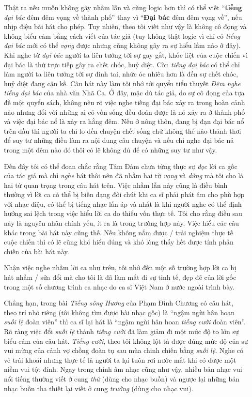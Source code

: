 \documentclass[../main.tex]{subfiles}
\begin{document}
\begin{multicols}{2}
Thật ra nếu muốn không gây nhầm lẫn và cũng logic hơn thì có thể viết “\textbf{tiếng }\textit{đại bác} đêm đêm vọng về thành phố” thay vì “\textbf{Đại bác} đêm đêm vọng về”, nếu nhịp điệu bài hát cho phép. Tuy nhiên, theo tôi viết như vậy là không cô đọng và không biểu cảm bằng cách viết của tác giả (tuy không thật logic vì chỉ có \textit{tiếng đại bác} mới có thể \textit{vọng }được nhưng cũng không gây ra sự hiểu lầm nào ở đây). Khi nghe từ \textit{đại bác} người ta liên tưởng tới sự gay gắt, khốc liệt của cuộc chiến vì đại bác là thứ trực tiếp gây ra chết chóc, huỷ diệt. Còn \textit{tiếng đại bác} có thể chỉ làm người ta liên tưởng tới sự đinh tai, nhức óc nhiêu hơn là đến sự chết chóc, huỷ diệt đang cận kề. Câu hát này làm tôi nhớ tới quyển tiểu thuyết \textit{Đêm nghe tiếng đại bác} của nhà văn Nhã Ca. Ở đây, mặc dù tác giả, do sự cô đọng của tựa đề một quyển sách, không nêu rõ việc nghe tiếng đại bác xảy ra trong hoàn cảnh nào nhưng đối với những ai có vốn sống đều đoán được là nó xảy ra ở thành phố và việc đại bác nổ là xảy ra hằng đêm. Nếu ở nông thôn, đang bị đạn đại bác nổ trên đầu thì người ta chỉ lo đến chuyện chết sống chứ không thể nào thảnh thơi để suy tư những điều làm ra nội dung câu chuyện và nếu chỉ nghe đại bác nả trong một đêm nào đó thôi có lẽ không đủ để có những suy tư như vậy. 
 
Đến đây tôi có thể đoan chắc rằng Tâm Đàm chưa từng thực sự \textit{đọc} lời ca gốc của tác giả mà chỉ \textit{nghe} hát thôi nên đã nhầm hai từ \textit{vọng} và \textit{dừng} mà tôi cho là hai từ quan trọng trong câu hát trên. Việc nhầm lẫn này cũng là điều bình thường vì lời ca có thể bị biến dạng đôi chút khi ca sĩ phải phát âm cho phù hợp với nhạc điệu, có thể bị tiếng nhạc lấn áp và nhất là khi người nghe có thể định hướng sai lệch trong việc hiểu lời ca do thiếu vốn thực tế. Tôi cho rằng điều sau này là nguyên nhân chính yếu, ít ra là trong trường hợp này. Việc hiểu các câu khác trong bài hát này cũng thế. Nếu không nắm được / trải nghiệm thực tế cuộc chiến thì có lẽ cũng khó hiểu đúng và khó lòng thấy hết được tính phản chiến của bài hát này. 
  
Nhận việc nghe nhầm lời ca như trên, tôi nhớ đến một số trường hợp lời ca bị hát nhầm / sửa đổi mà cho tôi là đã làm mất đi sự tinh tế, đẹp đẽ của lời gốc trong một số chương trình ca nhạc do ca sĩ Việt Nam ở nước ngoài trình bày. 
 
Chẳng hạn, trong bài \textit{Tiếng sông Hương} của Phạm Đình Chương có câu hát, theo trí nhớ riêng (tôi không tìm được bài nhạc gốc) là “ngậm ngùi hân hoan \textit{suối lệ} đoàn viên” thì ca sĩ lại hát là “ngậm ngùi hân hoan \textit{tiếng cười} đoàn viên”.  Rõ ràng việc đổi \textit{suối lệ} thành \textit{tiếng cười} đã làm giảm đi một mức độ to lớn sự biểu cảm của câu hát. \textit{Tiếng cười}, theo tôi không lột tả được đúng mức độ của sự vui mừng của cảnh vợ chồng đoàn tụ sau mùa chinh chiến bằng \textit{suối lệ}. Nghe có vẻ trái khoái nhưng thực tế là người ta lại tuôn rơi nước mắt khi có được một niềm vui tột đỉnh.  Ngay trong chính âm nhạc cũng như vậy, nhiều bản nhạc vui nổi tiếng thường viết ở cung \textit{thứ} (dùng cho nhạc buồn) và ngược lại những bản nhạc buồn tha thiết lại viết ở cung \textit{trưởng} (dùng cho nhạc vui). 
 

\end{multicols}
\end{document}
